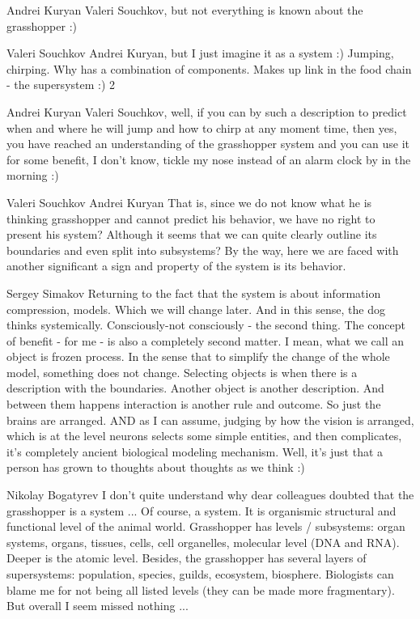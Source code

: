 \documentclass[11pt,a4paper]{article}
\begin{document}
Andrei Kuryan Valeri Souchkov, but not everything is known about the
grasshopper :)

Valeri Souchkov Andrei Kuryan, but I just imagine it as a system :) Jumping,
chirping. Why has a combination of components. Makes up link in the food chain
- the supersystem :) 2

Andrei Kuryan Valeri Souchkov, well, if you can by such a description to
predict when and where he will jump and how to chirp at any moment time, then
yes, you have reached an understanding of the grasshopper system and you can
use it for some benefit, I don’t know, tickle my nose instead of an alarm
clock by in the morning :)

Valeri Souchkov Andrei Kuryan That is, since we do not know what he is
thinking grasshopper and cannot predict his behavior, we have no right to
present his system? Although it seems that we can quite clearly outline its
boundaries and even split into subsystems? By the way, here we are faced with
another significant a sign and property of the system is its behavior.

Sergey Simakov Returning to the fact that the system is about information
compression, models. Which we will change later. And in this sense, the dog
thinks systemically. Consciously-not consciously - the second thing. The
concept of benefit - for me - is also a completely second matter. I mean, what
we call an object is frozen process. In the sense that to simplify the change
of the whole model, something does not change. Selecting objects is when there
is a description with the boundaries. Another object is another
description. And between them happens interaction is another rule and
outcome. So just the brains are arranged. AND as I can assume, judging by how
the vision is arranged, which is at the level neurons selects some simple
entities, and then complicates, it’s completely ancient biological modeling
mechanism. Well, it’s just that a person has grown to thoughts about thoughts
as we think :)

Nikolay Bogatyrev I don’t quite understand why dear colleagues doubted
that the grasshopper is a system ... Of course, a system. It is organismic
structural and functional level of the animal world. Grasshopper has levels /
subsystems: organ systems, organs, tissues, cells, cell organelles,
molecular level (DNA and RNA). Deeper is the atomic level. Besides,
the grasshopper has several layers of supersystems: population, species, guilds,
ecosystem, biosphere. Biologists can blame me for not being all
listed levels (they can be made more fragmentary). But overall I seem
missed nothing ...
\end{document}
